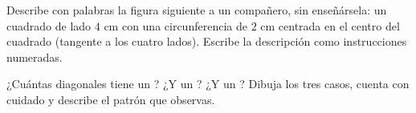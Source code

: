 \begin{exercise}[$\star\star$]\label{exo:g4:geometry:10}
Describe con palabras la figura siguiente a un compañero, sin enseñársela:
un cuadrado de lado $4$ cm con una circunferencia de  $2$ cm centrada
en el centro del cuadrado (tangente a los cuatro lados). Escribe la
descripción como instrucciones numeradas.
\end{exercise}

\begin{exercise}[$\star\star$]\label{exo:g4:geometry:11}
¿Cuántas diagonales tiene un ? ¿Y un ? ¿Y un ?
Dibuja los tres casos, cuenta con cuidado y describe el patrón que
observas.
\end{exercise}
